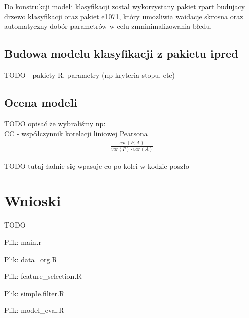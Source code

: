 \documentclass[a4paper,11pt,twoside]{mwrep}  %
\begin{document}
Do konstrukcji modeli klasyfikacji został wykorzystany pakiet rpart budujacy drzewo klasyfikacji oraz pakiet
e1071, który umozliwia waidacje skrosna oraz automatyczny dobór parametrów w celu zmninimalizowania
błedu.

\section{Budowa modelu klasyfikacji z pakietu ipred}
TODO - pakiety R, parametry (np kryteria stopu, etc)

\section{Ocena modeli}
TODO opisać że wybraliśmy np: \\
CC - współczynnik korelacji liniowej Pearsona\\
\begin{gather*}
	\frac{cov(P,A)}{var(P) \cdot var(A)}
\end{gather*}

TODO tutaj ładnie się wpasuje co po kolei w kodzie poszło

\endgroup




\begingroup
\let\clearpage\relax
\chapter{Wnioski}

TODO\\

\endgroup




		
\pagebreak
Plik: main.r

\clearpage

\pagebreak
Plik: data{\_}org.R

\clearpage

\pagebreak
Plik: feature{\_}selection.R

\clearpage

\pagebreak
Plik: simple.filter.R

\clearpage

\pagebreak
Plik: model{\_}eval.R

\clearpage
\end{document}
